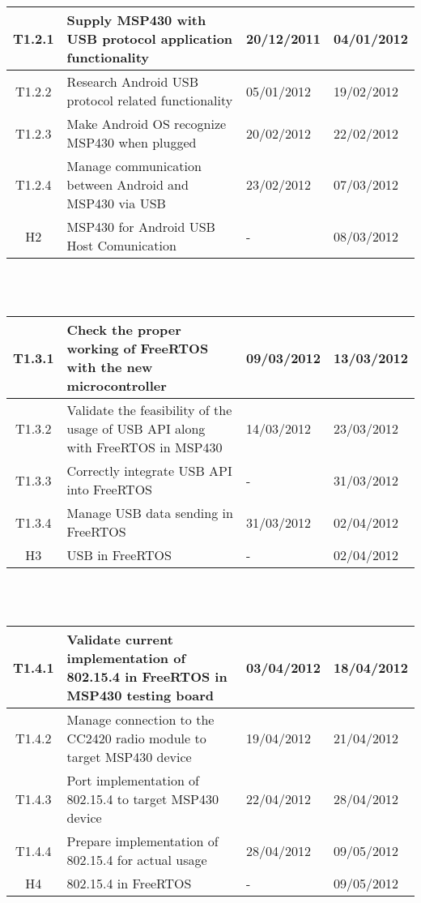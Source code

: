 		\begin{tabular}{| c | p{6cm} | l | l |} %
		\hline
			T1.2.1 & Supply MSP430 with USB protocol application functionality & 20/12/2011 & 04/01/2012\\ \hline
			T1.2.2 & Research Android USB protocol related functionality & 05/01/2012 & 19/02/2012\\ \hline
			T1.2.3 & Make Android OS recognize MSP430 when plugged	 & 20/02/2012 & 22/02/2012\\ \hline
T1.2.4 & Manage communication between Android and MSP430 via USB & 23/02/2012 & 07/03/2012\\ \hline
			H2 & MSP430 for Android USB Host Comunication & - & 08/03/2012\\ \hline
		\end{tabular}\\\\

		\begin{tabular}{| c | p{6cm} | l | l |} %
		\hline
T1.3.1 & Check the proper working of FreeRTOS with the new microcontroller & 09/03/2012 & 13/03/2012\\ \hline
T1.3.2 & Validate the feasibility of the usage of USB API along with FreeRTOS in MSP430 & 14/03/2012 & 23/03/2012\\ \hline
T1.3.3 & Correctly integrate USB API into FreeRTOS & - & 31/03/2012\\ \hline

T1.3.4 & Manage USB data sending in FreeRTOS & 31/03/2012 & 02/04/2012\\ \hline
H3 & USB in FreeRTOS & - & 02/04/2012\\ \hline
\end{tabular}\\\\

\begin{tabular}{| c | p{6cm} | l | l |} %
\hline
		T1.4.1 & Validate current implementation of 802.15.4 in FreeRTOS in MSP430 testing board & 03/04/2012 & 18/04/2012\\ \hline
		T1.4.2 & Manage connection to the CC2420 radio module to target MSP430 device & 19/04/2012 & 21/04/2012\\ \hline
		T1.4.3 & Port implementation of 802.15.4 to target MSP430 device & 22/04/2012 & 28/04/2012\\ \hline
		T1.4.4 & Prepare implementation of 802.15.4 for actual usage & 28/04/2012 & 09/05/2012\\ \hline
		H4 & 802.15.4 in FreeRTOS & - & 09/05/2012\\
		\hline
		\end{tabular}\\\\

